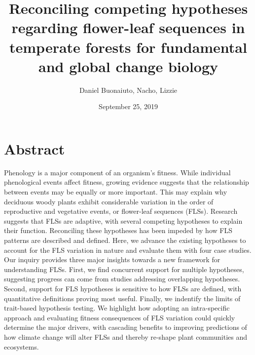 \documentclass[12pt]{article}
\title{Reconciling competing hypotheses regarding flower-leaf sequences in temperate forests for fundamental and global change biology}
\author{Daniel Buonaiuto, Nacho, Lizzie}
\date{September 25, 2019}
\begin{document}
\maketitle

\begin{enumerate}
\end{enumerate}
\section*{Abstract}
Phenology is a major component of an organism's fitness. While individual phenological events affect fitness, growing evidence suggests that the relationship between events may be equally or more important. This may explain why deciduous woody plants exhibit considerable variation in the order of reproductive and vegetative events, or flower-leaf sequences (FLSs). Research suggests that FLSs are adaptive, with several competing hypotheses to explain their function. Reconciling these hypotheses has been impeded by how FLS patterns are described and defined. Here, we advance the existing hypotheses to account for the FLS variation in nature and evaluate them with four case studies. Our inquiry provides three major insights towards a new framework for understanding FLSs. First, we find concurrent support for multiple hypotheses, suggesting progress can come from studies addressing overlapping hypotheses. Second, support for FLS hypotheses is sensitive to how FLSs are defined, with quantitative definitions proving most useful. Finally, we indentify the limits of trait-based hypothesis testing. We highlight how adopting an intra-specific approach and evaluating fitness consequences of FLS variation could quickly determine the major drivers, with cascading benefits to improving predictions of how climate change will alter FLSs and thereby re-shape plant communities and ecosystems.
\end{document}
